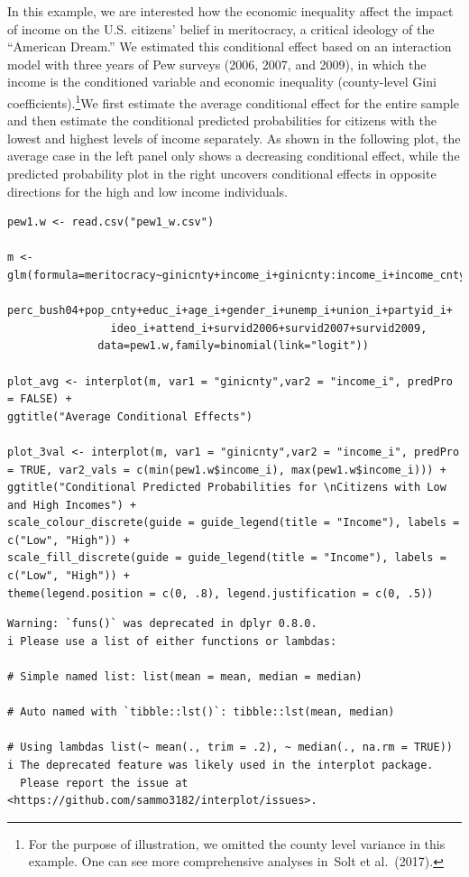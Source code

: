 \documentclass[
  article]{jss}
\begin{document}
In this example, we are interested how the economic inequality affect
the impact of income on the U.S. citizens' belief in meritocracy, a
critical ideology of the ``American Dream.'' We estimated this
conditional effect based on an interaction model with three years of Pew
surveys (2006, 2007, and 2009), in which the income is the conditioned
variable and economic inequality (county-level Gini
coefficients).\footnote{For the purpose of illustration, we omitted the
  county level variance in this example. One can see more comprehensive
  analyses in~Solt et al.~(2017).}We first estimate the average
conditional effect for the entire sample and then estimate the
conditional predicted probabilities for citizens with the lowest and
highest levels of income separately. As shown in the following plot, the
average case in the left panel only shows a decreasing conditional
effect, while the predicted probability plot in the right uncovers
conditional effects in opposite directions for the high and low income
individuals.

\begin{verbatim}
pew1.w <- read.csv("pew1_w.csv")

m <- glm(formula=meritocracy~ginicnty+income_i+ginicnty:income_i+income_cnty+black_cnty+
                perc_bush04+pop_cnty+educ_i+age_i+gender_i+unemp_i+union_i+partyid_i+
                ideo_i+attend_i+survid2006+survid2007+survid2009,
              data=pew1.w,family=binomial(link="logit"))
              
plot_avg <- interplot(m, var1 = "ginicnty",var2 = "income_i", predPro = FALSE) + 
ggtitle("Average Conditional Effects")

plot_3val <- interplot(m, var1 = "ginicnty",var2 = "income_i", predPro = TRUE, var2_vals = c(min(pew1.w$income_i), max(pew1.w$income_i))) +
ggtitle("Conditional Predicted Probabilities for \nCitizens with Low and High Incomes") +
scale_colour_discrete(guide = guide_legend(title = "Income"), labels = c("Low", "High")) + 
scale_fill_discrete(guide = guide_legend(title = "Income"), labels = c("Low", "High")) +
theme(legend.position = c(0, .8), legend.justification = c(0, .5))
\end{verbatim}

\begin{verbatim}
Warning: `funs()` was deprecated in dplyr 0.8.0.
i Please use a list of either functions or lambdas:

# Simple named list: list(mean = mean, median = median)

# Auto named with `tibble::lst()`: tibble::lst(mean, median)

# Using lambdas list(~ mean(., trim = .2), ~ median(., na.rm = TRUE))
i The deprecated feature was likely used in the interplot package.
  Please report the issue at <https://github.com/sammo3182/interplot/issues>.
\end{verbatim}
\end{document}
